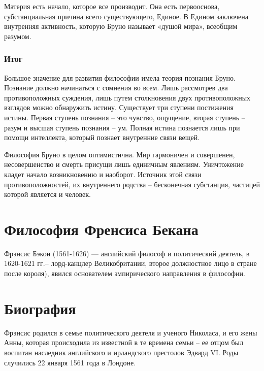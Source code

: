 \documentclass[
]{article}
\begin{document}
Материя есть начало, которое все производит. Она есть первооснова,
субстанциальная причина всего существующего, Единое. В Едином заключена
внутренняя активность, которую Бруно называет «душой мира», всеобщим
разумом.

\hypertarget{ux438ux442ux43eux433-8}{%
\subsubsection{Итог}\label{ux438ux442ux43eux433-8}}

Большое значение для развития философии имела теория познания Бруно.
Познание должно начинаться с сомнения во всем. Лишь рассмотрев два
противоположных суждения, лишь путем столкновения двух противоположных
взглядов можно обнаружить истину. Существует три ступени постижения
истины. Первая ступень познания -- это чувство, ощущение, вторая ступень
-- разум и высшая ступень познания -- ум. Полная истина познается лишь
при помощи интеллекта, который познает внутренние связи вещей.

Философия Бруно в целом оптимистична. Мир гармоничен и совершенен,
несовершенство и смерть присущи лишь единичным явлениям. Уничтожение
кладет начало возникновению и наоборот. Источник этой связи
противоположностей, их внутреннего родства -- бесконечная субстанция,
частицей которой является и человек.

\hypertarget{ux444ux438ux43bux43eux441ux43eux444ux438ux44f-ux444ux440ux435ux43dux441ux438ux441ux430-ux431ux435ux43aux430ux43dux430}{%
\section{Философия Френсиса
Бекана}\label{ux444ux438ux43bux43eux441ux43eux444ux438ux44f-ux444ux440ux435ux43dux441ux438ux441ux430-ux431ux435ux43aux430ux43dux430}}

Фрэнсис Бэкон (1561-1626) --- английский философ и политический деятель,
в 1620-1621 гг.-- лорд-канцлер Великобритании, второе должностное лицо в
стране после короля), явился основателем эмпирического направления в
философии.

\hypertarget{ux431ux438ux43eux433ux440ux430ux444ux438ux44f-2}{%
\section{Биография}\label{ux431ux438ux43eux433ux440ux430ux444ux438ux44f-2}}

Фрэнсис родился в семье политического деятеля и ученого Николаса, и его
жены Анны, которая происходила из известной в те времена семьи -- ее
отцом был воспитан наследник английского и ирландского престолов Эдвард
VI. Роды случились 22 января 1561 года в Лондоне.
\end{document}
